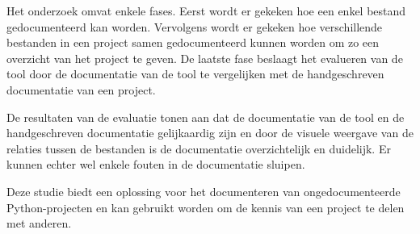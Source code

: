 Het onderzoek omvat enkele fases. Eerst wordt er gekeken hoe een enkel bestand gedocumenteerd kan worden. 
Vervolgens wordt er gekeken hoe verschillende bestanden in een project samen gedocumenteerd kunnen worden om zo een overzicht van het project te geven.
De laatste fase beslaagt het evalueren van de tool door de documentatie van de tool te vergelijken met de handgeschreven documentatie van een project.

De resultaten van de evaluatie tonen aan dat de documentatie van de tool en de handgeschreven documentatie gelijkaardig zijn en door de visuele weergave van de relaties tussen de bestanden is de documentatie overzichtelijk en duidelijk.
Er kunnen echter wel enkele fouten in de documentatie sluipen.

Deze studie biedt een oplossing voor het documenteren van ongedocumenteerde Python-projecten en kan gebruikt worden om de kennis van een project te delen met anderen.
